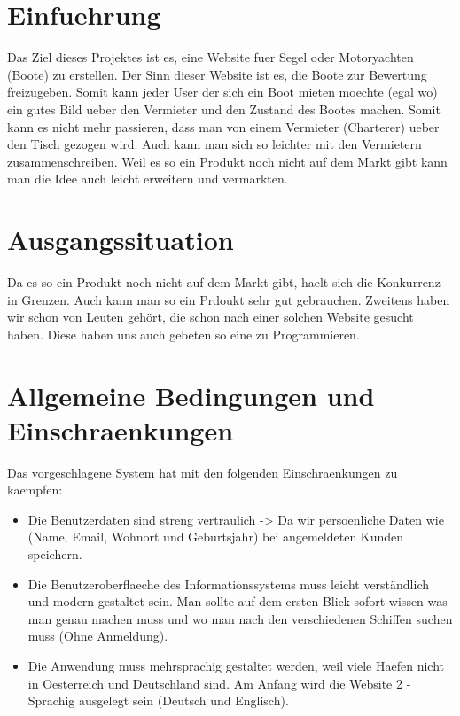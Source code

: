 \documentclass[12pt]{article}
\theoremstyle{definition}
\begin{document}
\section{Einfuehrung}
\begin{article}
Das Ziel dieses Projektes ist es, eine Website fuer Segel oder Motoryachten (Boote) zu erstellen. Der Sinn dieser Website ist es, die Boote zur Bewertung freizugeben. Somit kann jeder User der sich ein Boot mieten moechte (egal wo) ein gutes Bild ueber den Vermieter und den Zustand des Bootes machen. Somit kann es nicht mehr passieren, dass man von einem Vermieter (Charterer) ueber den Tisch gezogen wird. Auch kann man sich so leichter mit den Vermietern zusammenschreiben. Weil es so ein Produkt noch nicht auf dem Markt gibt kann man die Idee auch leicht erweitern und vermarkten. 

\end{article}
\pagebreak

\section{Ausgangssituation}
\begin{article}
   Da es so ein Produkt noch nicht auf dem Markt gibt, haelt sich die Konkurrenz in Grenzen. Auch kann man so ein Prdoukt sehr gut gebrauchen. Zweitens haben wir schon von Leuten gehört, die schon nach einer solchen Website gesucht haben. Diese haben uns auch gebeten so eine zu Programmieren. 
\end{article}

\pagebreak

\section{Allgemeine Bedingungen und Einschraenkungen}

\begin{article}
Das vorgeschlagene System hat mit den folgenden Einschraenkungen zu kaempfen:
\begin{itemize}
\item Die Benutzerdaten sind streng vertraulich -> Da wir persoenliche Daten wie (Name, Email, Wohnort und Geburtsjahr) bei angemeldeten Kunden speichern.
\item Die Benutzeroberflaeche des Informationssystems muss leicht verständlich und modern gestaltet sein. Man sollte auf dem ersten Blick sofort wissen was man genau machen muss und wo man nach den verschiedenen Schiffen suchen muss (Ohne Anmeldung).
\item Die Anwendung muss mehrsprachig gestaltet werden, weil viele Haefen nicht in Oesterreich und Deutschland sind. Am Anfang wird die Website 2 - Sprachig ausgelegt sein (Deutsch und Englisch).
\end{itemize}
\end{article}
\end{document}
